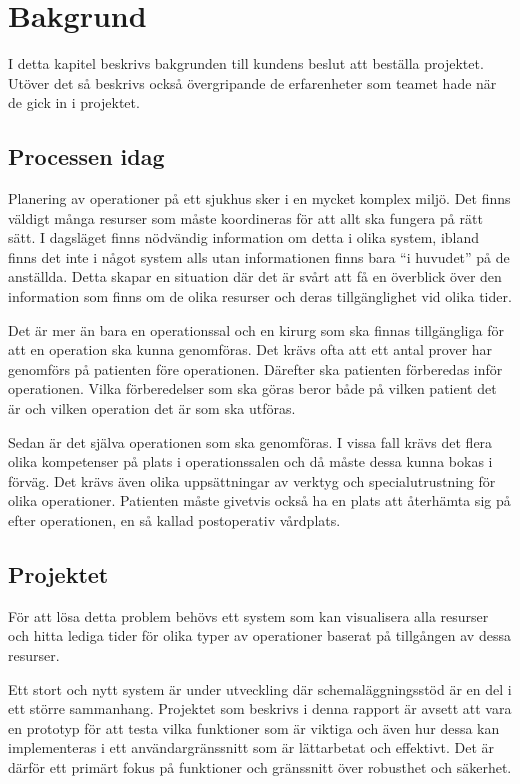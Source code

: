 \chapter{Bakgrund}
I detta kapitel beskrivs bakgrunden till kundens beslut att beställa projektet.
Utöver det så beskrivs också övergripande de erfarenheter som teamet hade när de gick
in i projektet.

\section{Processen idag}
Planering av operationer på ett sjukhus sker i en mycket komplex miljö. Det
finns väldigt många resurser som måste koordineras för att allt ska fungera på rätt sätt.
I dagsläget finns nödvändig information om detta i olika system, ibland finns
det inte i något system alls utan informationen finns bara \enquote{i huvudet} på de anställda. Detta
skapar en situation där det är svårt att få en överblick över den information som finns om de olika
resurser och deras tillgänglighet vid olika tider.

Det är mer än bara en operationssal och en kirurg som ska finnas tillgängliga
för att en operation ska kunna genomföras. Det krävs ofta att ett antal prover har
genomförs på patienten före operationen. Därefter ska patienten
förberedas inför operationen. Vilka förberedelser som ska göras beror både på
vilken patient det är och vilken operation det är som ska utföras. 

Sedan är det
själva operationen som ska genomföras. I vissa fall krävs det flera olika
kompetenser på plats i operationssalen och då måste dessa kunna bokas i förväg.
Det krävs även olika uppsättningar av verktyg och specialutrustning för olika
operationer.
Patienten måste givetvis också ha en plats att återhämta sig på efter
operationen, en så kallad postoperativ vårdplats.

\section{Projektet}
För att lösa detta problem behövs ett system som kan visualisera alla resurser
och hitta lediga tider för olika typer av operationer baserat på tillgången av
dessa resurser.

Ett stort och nytt system är under utveckling där schemaläggningsstöd är en del
i ett större sammanhang. Projektet som beskrivs i denna rapport är avsett att vara
en prototyp för att testa vilka funktioner som är viktiga och även hur dessa
kan implementeras i ett användargränssnitt som är lättarbetat och effektivt.
Det är därför ett primärt fokus på funktioner och gränssnitt över robusthet och
säkerhet.

